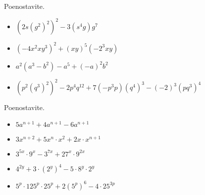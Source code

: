         \begin{naloga}
            Poenostavite.
            \begin{itemize}
                \item $(2s(g^2)^2)^2-3(s^4g)g^7$ 
                \item $(-4x^2xy^3)^2+(xy)^5(-2^3xy)$
                \item $a^2(a^3-b^2)-a^5+(-a)^2b^2$ 
                \item $(p^2(q^3)^2)^2-2p^4q^{12}+7(-p^3p)(q^4)^3-(-2)^3(pq^3)^4$ 
            \end{itemize}
        \end{naloga}

        \begin{naloga}
            Poenostavite.
            \begin{itemize}
                \item $5a^{n+1}+4a^{n+1}-6a^{n+1}$ 
                \item $3x^{n+2}+5x^n\cdot x^2+2x\cdot x^{n+1}$
                \item $3^{5x}\cdot 9^x-3^{7x}+27^x\cdot 9^{2x}$ 
                \item $4^{2y}+3\cdot(2^y)^4-5\cdot 8^y\cdot 2^y$ 
                \item $5^p\cdot 125^p\cdot 25^p+2(5^p)^6-4\cdot 25^{3p}$ 
            \end{itemize}
        \end{naloga}
